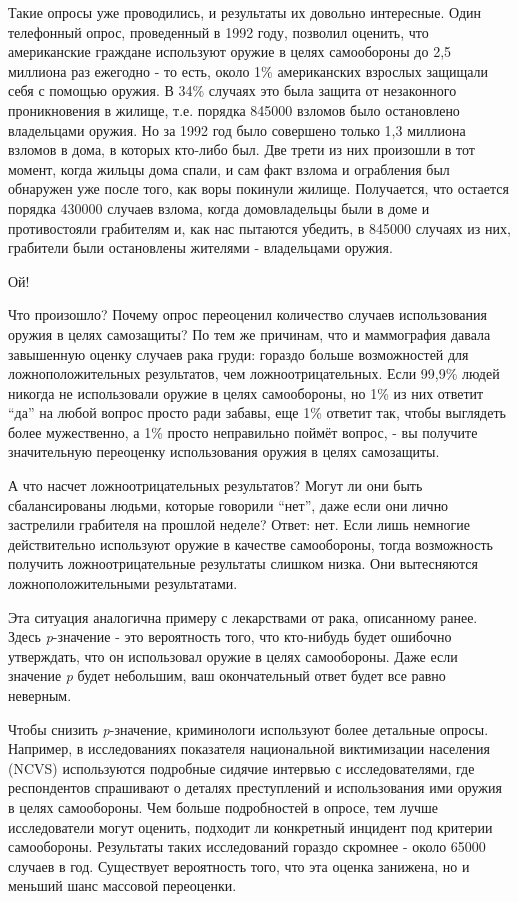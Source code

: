 Такие опросы уже проводились, и результаты их довольно интересные. Один телефонный опрос, проведенный в 1992 году, позволил оценить, что американские граждане используют оружие в целях самообороны до 2,5 миллиона раз ежегодно - то есть, около 1\% американских взрослых защищали себя с помощью оружия. В 34\% случаях это была защита от незаконного проникновения в жилище, т.е. порядка 845000 взломов было остановлено владельцами оружия. Но за 1992 год было совершено только 1,3 миллиона взломов в дома, в которых кто-либо был. Две трети из них произошли в тот момент, когда жильцы дома спали, и сам факт взлома и ограбления был обнаружен уже после того, как воры покинули жилище. Получается, что остается порядка 430000 случаев взлома, когда домовладельцы были в доме и противостояли грабителям и, как нас пытаются убедить, в 845000 случаях из них, грабители были остановлены жителями - владельцами оружия.\cite{hemenway_survey_1996}   


Ой!


Что произошло? Почему опрос переоценил количество случаев использования оружия в целях самозащиты? По тем же причинам, что и маммография давала завышенную оценку случаев рака груди: гораздо больше возможностей для ложноположительных результатов, чем ложноотрицательных. Если 99,9\% людей никогда не использовали оружие в целях самообороны, но 1\% из них ответит ``да'' на любой вопрос просто ради забавы, еще 1\% ответит так, чтобы выглядеть более мужественно, а 1\% просто неправильно поймёт вопрос, - вы получите значительную переоценку использования оружия в целях самозащиты.

А что насчет ложноотрицательных результатов? Могут ли они быть сбалансированы людьми, которые говорили ``нет'', даже если они лично застрелили грабителя на прошлой неделе? Ответ: нет. Если лишь немногие действительно используют оружие в качестве самообороны, тогда возможность получить ложноотрицательные результаты слишком низка. Они вытесняются ложноположительными результатами.

Эта ситуация аналогична примеру с лекарствами от рака, описанному ранее. Здесь \emph{p}-значение - это вероятность того, что кто-нибудь будет ошибочно утверждать, что он использовал оружие в целях самообороны. Даже если значение \emph{p} будет небольшим, ваш окончательный ответ будет все равно неверным. 


Чтобы снизить \emph{p}-значение, криминологи используют более детальные опросы. Например, в исследованиях показателя национальной виктимизации населения (NCVS) используются подробные сидячие интервью с исследователями, где респондентов спрашивают о деталях преступлений и использования ими оружия в целях самообороны. Чем больше подробностей в опросе, тем лучше исследователи могут оценить, подходит ли конкретный инцидент под критерии самообороны. Результаты таких исследований гораздо скромнее - около 65000 случаев в год. Существует вероятность того, что эта оценка занижена, но и меньший шанс массовой переоценки.     


